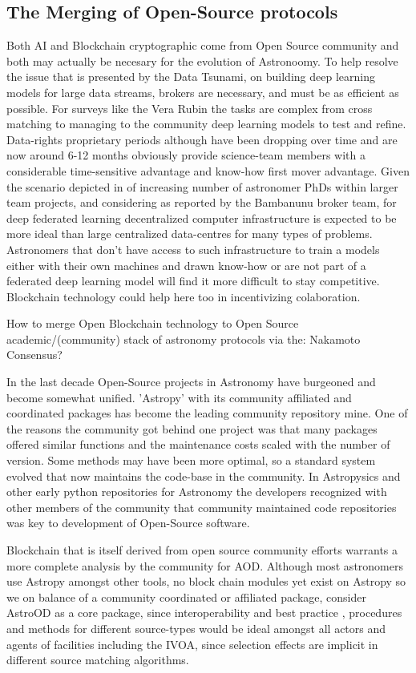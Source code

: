 \documentclass[final,5p,times,twocolumn,authoryear]{elsarticle}
\begin{document}
\subsection{The Merging of Open-Source protocols}

Both AI and Blockchain cryptographic come from Open Source community and both may actually be necesary for the evolution of Astronoomy. To help resolve the issue that is presented by the Data Tsunami, on building deep learning models for large data streams, brokers are necessary, and must be as efficient as possible. For surveys like the Vera Rubin the tasks are complex from cross matching to managing to the community deep learning models to test and refine. Data-rights proprietary periods although have been dropping over time and are now around 6-12 months obviously provide science-team members with a considerable time-sensitive advantage and know-how first mover advantage.  Given the scenario depicted in \label{btc2:sec:sub:half} of increasing number of astronomer PhDs within larger team projects, and considering as reported by the Bambanunu broker team, for deep federated learning decentralized computer infrastructure is expected to be more ideal than large centralized data-centres for many types of problems.  Astronomers that don't have access to such infrastructure to train a models either with their own machines and drawn know-how or are not part of a federated deep learning model will find it more difficult to stay competitive. Blockchain technology could help here too in incentivizing colaboration.   

How to merge Open Blockchain technology to Open Source academic/(community) stack of astronomy protocols via the: Nakamoto Consensus?

In the last decade Open-Source projects in Astronomy have burgeoned and become somewhat unified. 'Astropy' with its community affiliated and coordinated packages has become the leading community repository mine.  One of the reasons the community got behind one project was that many packages offered similar functions and the maintenance costs scaled with the number of version. Some methods may have been more optimal, so a standard system evolved that now maintains the code-base in the community. In Astropysics and other early python repositories for Astronomy the developers recognized with other members of the community that community maintained code repositories was key to development of Open-Source software.

Blockchain that is itself derived from open source community efforts warrants a more complete analysis by the community for AOD. Although most astronomers use Astropy amongst other tools, no block chain modules yet exist on Astropy so we on balance of a community coordinated or affiliated package, consider AstroOD as a core package, since interoperability and best practice , procedures and methods for different source-types would be ideal amongst all actors and agents of facilities including the IVOA, since selection effects are implicit in different source matching algorithms.
\end{document}
